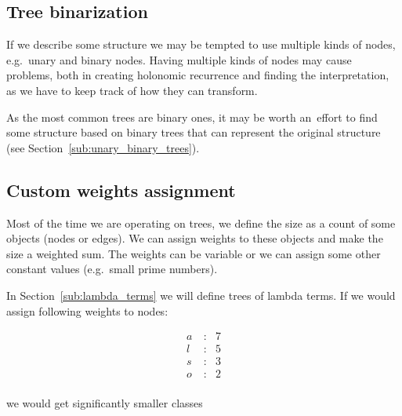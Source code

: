 \documentclass[final]{article}
\theoremstyle{definition}
\theoremstyle{definition}
\theoremstyle{remark}
\begin{document}
\subsection{Tree binarization}%
\label{sub:tree_binarization}

If we describe some structure we may be tempted to use multiple kinds of nodes, e.g.~unary and binary nodes. Having multiple kinds of nodes may cause problems, both in creating holonomic recurrence and finding the interpretation, as we have to keep track of how they can transform.

As the most common trees are binary ones, it may be worth an~effort to find some structure based on binary trees that can represent the original structure (see Section~\ref{sub:unary_binary_trees}).

\subsection{Custom weights assignment}%
\label{sub:weights_variablization}

Most of the time we are operating on trees, we define the size as a count of some objects (nodes or edges). We can assign weights to these objects and make the size a weighted sum. The weights can be variable or we can assign some other constant values (e.g.~small prime numbers).

In Section~\ref{sub:lambda_terms} we will define trees of lambda terms. If we would assign following weights to nodes:

\[\begin{array}{rcl}
        a~&:& 7\\
        l &:& 5\\
        s &:& 3\\
        o &:& 2\\
\end{array}\]

we would get significantly smaller classes
\end{document}
